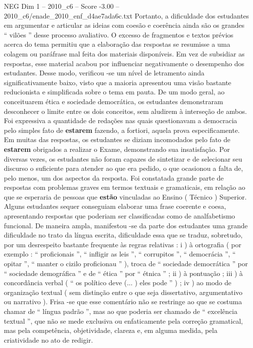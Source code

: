 \begin{textsample}{NEG Dim 1 – 2010\_c6 – Score -3.00 – 2010\_c6/enade\_2010\_enf\_d4ae7ada6c.txt}
Portanto, a dificuldade dos estudantes em argumentar e articular as ideias com coesão e coerência ainda são os grandes “ vilões ” desse processo avaliativo.
O excesso de fragmentos e textos prévios acerca do tema permitiu que a elaboração das respostas se resumisse a uma colagem ou paráfrase mal feita dos materiais disponíveis.
Em vez de subsidiar as respostas, esse material acabou por influenciar negativamente o desempenho dos estudantes.
Desse modo, verificou -se um nível de letramento ainda significativamente baixo, visto que a maioria apresentou uma visão bastante reducionista e simplificada sobre o tema em pauta.
De um modo geral, ao conceituarem ética e sociedade democrática, os estudantes demonstraram desconhecer o limite entre os dois conceitos, sem aludirem à interseção de ambos.
Foi expressiva a quantidade de redações nas quais questionavam a democracia pelo simples fato de \textbf{estarem} fazendo, a fortiori, aquela prova especificamente.
Em muitas das respostas, os estudantes se diziam incomodados pelo fato de \textbf{estarem} obrigados a realizar o Exame, demonstrando sua insatisfação.
Por diversas vezes, os estudantes não foram capazes de sintetizar e de selecionar seu discurso o suficiente para atender ao que era pedido, o que ocasionou a falta de, pelo menos, um dos aspectos da resposta.
Foi constatada grande parte de respostas com problemas graves em termos textuais e gramaticais, em relação ao que se esperaria de pessoas que \textbf{estão} vinculadas ao Ensino ( Técnico ) Superior.
Alguns estudantes sequer conseguiam elaborar uma frase coerente e coesa, apresentando respostas que poderiam ser classificadas como de analfabetismo funcional.
De maneira ampla, manifestou -se da parte dos estudantes uma grande dificuldade no trato da língua escrita, dificuldade essa que se traduz, sobretudo, por um desrespeito bastante frequente às regras relativas : i ) à ortografia ( por exemplo : “ proficionais ”, “ infligir as leis ”, “ corrupitos ”, “ democrácia ”, “ opitar ”, “ manter o cizilo proficionau ” ), troca de “ sociedade democrática ” por “ sociedade demográfica ” e de “ ética ” por “ étnica ” ; ii ) à pontuação ; iii ) à concordância verbal ( “ os político deve (... ) eles pode ” ) ; iv ) ao modo de organização textual ( sem distinção entre o que seja dissertativo, argumentativo ou narrativo ).
Frisa -se que esse comentário não se restringe ao que se costuma chamar de “ língua padrão ”, mas ao que poderia ser chamado de “ excelência textual ”, que não se mede exclusiva ou enfaticamente pela correção gramatical, mas pela competência, objetividade, clareza e, em alguma medida, pela criatividade no ato de redigir.

\end{textsample}
